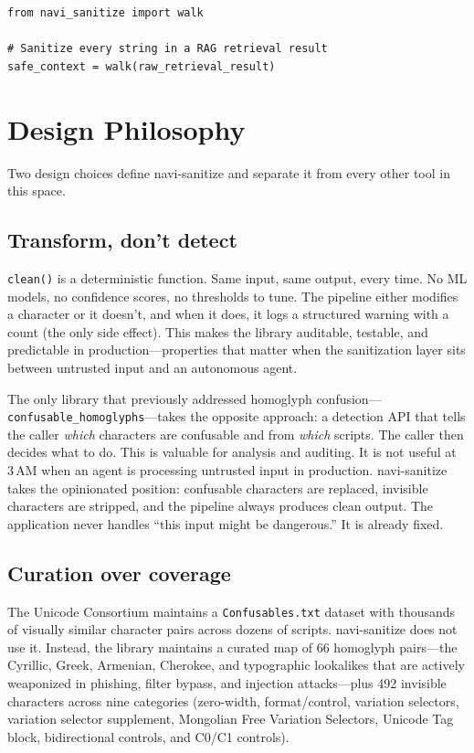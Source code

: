 \documentclass[11pt,letterpaper]{article}
\begin{document}
\begin{lstlisting}
from navi_sanitize import walk

# Sanitize every string in a RAG retrieval result
safe_context = walk(raw_retrieval_result)
\end{lstlisting}


\section{Design Philosophy}

Two design choices define navi-sanitize and separate it from every other tool in this space.

\subsection{Transform, don't detect}

\texttt{clean()} is a deterministic function. Same input, same output, every time. No ML models, no confidence scores, no thresholds to tune. The pipeline either modifies a character or it doesn't, and when it does, it logs a structured warning with a count (the only side effect). This makes the library auditable, testable, and predictable in production---properties that matter when the sanitization layer sits between untrusted input and an autonomous agent.

The only library that previously addressed homoglyph confusion---\texttt{confusable\_homoglyphs}---takes the opposite approach: a detection API that tells the caller \emph{which} characters are confusable and from \emph{which} scripts. The caller then decides what to do. This is valuable for analysis and auditing. It is not useful at 3\,AM when an agent is processing untrusted input in production. navi-sanitize takes the opinionated position: confusable characters are replaced, invisible characters are stripped, and the pipeline always produces clean output. The application never handles ``this input might be dangerous.'' It is already fixed.

\subsection{Curation over coverage}

The Unicode Consortium maintains a \texttt{Confusables.txt} dataset with thousands of visually similar character pairs across dozens of scripts. navi-sanitize does not use it. Instead, the library maintains a curated map of 66 homoglyph pairs---the Cyrillic, Greek, Armenian, Cherokee, and typographic lookalikes that are actively weaponized in phishing, filter bypass, and injection attacks---plus 492 invisible characters across nine categories (zero-width, format/control, variation selectors, variation selector supplement, Mongolian Free Variation Selectors, Unicode Tag block, bidirectional controls, and C0/C1 controls).
\end{document}
